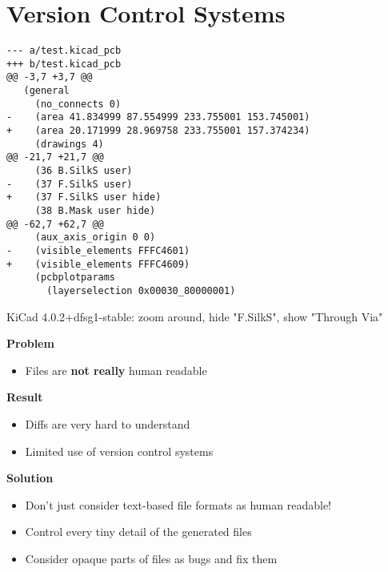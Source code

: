 \section{Version Control Systems}

\begin{frame}[fragile]{\secname}
  \begin{verbatim}
--- a/test.kicad_pcb
+++ b/test.kicad_pcb
@@ -3,7 +3,7 @@
   (general
     (no_connects 0)
-    (area 41.834999 87.554999 233.755001 153.745001)
+    (area 20.171999 28.969758 233.755001 157.374234)
     (drawings 4)
@@ -21,7 +21,7 @@
     (36 B.SilkS user)
-    (37 F.SilkS user)
+    (37 F.SilkS user hide)
     (38 B.Mask user hide)
@@ -62,7 +62,7 @@
     (aux_axis_origin 0 0)
-    (visible_elements FFFC4601)
+    (visible_elements FFFC4609)
     (pcbplotparams
       (layerselection 0x00030_80000001)\end{verbatim}
  
  \scriptsize{
    KiCad 4.0.2+dfsg1-stable:
    zoom around,
    hide "F.SilkS",
    show "Through Via"
  }
\end{frame}

\begin{frame}[noframenumbering]{\secname}
  \textbf{Problem}
  \begin{itemize}
    \item Files are \textbf{not really} human readable
  \end{itemize}

  \pause

  \textbf{Result}
  \begin{itemize}
    \item Diffs are very hard to understand
    \item Limited use of version control systems
  \end{itemize}

  \pause

  \textbf{Solution}
  \begin{itemize}
    \item Don't just consider text-based file formats as human readable!
    \item Control every tiny detail of the generated files
    \item Consider opaque parts of files as bugs and fix them
  \end{itemize}
\end{frame}
